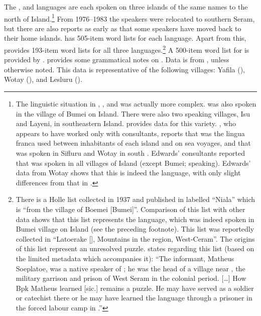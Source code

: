 \largerpage
The ,  and  languages are each spoken on three islands
of the same names to the north of  Island.\footnote{
		The linguistic situation in ,
		, and  was actually more complex.
		 was also spoken in the village of Bumei on  Island.
		There were also two  speaking villages,
		Isu and Layeni, in southeastern  Island.
		\citet{Chlenova2006} provides data for this  variety.
		\citet[52, 78]{vanEngelenhoven2003}, who appears to have worked
		only with  consultants,
		reports that  was the lingua franca used between inhabitants
		of each island and on sea voyages,
		and that  was spoken in Sifluru
		and Wotay in south .
		Edwards’  consultants reported that  was spoken in all
		villages of  Island (except Bumei;  speaking).
		Edwards’ data from Wotay shows that this is indeed the  language,
		with only slight differences from that in \citet{Taber1993}.}
From 1976--1983 the speakers were relocated to southern Seram,
but there are also reports as early as \citet[404]{Taber1993}
that some speakers have moved back to their home islands.
\citet{Edwards2023} has 505-item word lists for each language.
Apart from this, \citet{Taber1993} provides 193-item word lists
for all three languages.\footnote{
		There is a Holle list collected
		in 1937 and published in \citet[161--174]{Stokhof1981b} labelled “Niala”
		which is “from the village of Boemei [Bumei]”.
		Comparison of this list with other  data shows that this
		list represents the  language,
		which was indeed spoken in Bumei village on  Island (see the preceding footnote).
		This list was reportedly collected in “Latoerake [],
		Mountains in the  region, West-Ceram”.
		The origins of this list represent an unresolved puzzle.
		\citet[197]{Collins1982d} states regarding this list (based on
		the limited metadata which accompanies it): “The informant,
		Matheus Soeplatoe, was a native speaker of ; he was the
		head of a village near ,
		the military garrison and prison of West Seram in the colonial period.
		[{\ldots}] How Bpk Matheus learned  [sic.] remains a puzzle.
		He may have served as a soldier or catechist there or he may
		have learned the language through a prisoner in the forced labour
		camp in .”}
A 500-item word list for  is provided by \citet{Chlenova2004}.
\citet{vanEngelenhoven2003} provides some grammatical notes on .
Data is from \citet{Edwards2023}, unless otherwise noted.
This data is representative of the following villages: Yafila
(), Wotay (), and Lesluru ().

